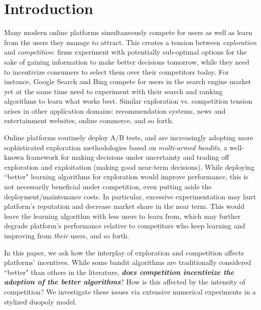 \documentclass[../competing_bandits_with_appendix.tex]{subfiles}
\begin{document}
\section{Introduction}\label{sec:intro}

Many modern online platforms simultaneously compete for users as well as learn from the users they manage to attract. This creates a tension between \textit{exploration} and \textit{competition}: firms experiment with potentially sub-optimal options for the sake of gaining information to make better decisions tomorrow, while they need to incentivize consumers to select them over their competitors today. For instance, Google Search and Bing compete for users in the search engine market yet at the same time need to experiment with their search and ranking algorithms to learn what works best. Similar exploration vs. competition tension arises in other application domains: recommendation systems, news and entertainment websites, online commerce, and so forth.


Online platforms routinely deploy A/B tests, and are increasingly adopting  more sophisticated exploration methodologies based on \emph{multi-armed bandits}, a well-known framework for making decisions under uncertainty and trading off exploration and exploitation (making good near-term decisions). While deploying ``better" learning algorithms for exploration would improve performance, this is not necessarily beneficial under competition, even putting aside the deployment/maintenance costs. In particular, excessive experimentation may hurt platform's reputation and decrease market share in the near term. This would leave the learning algorithm with less users to learn from, which may further degrade platform's performance relative to competitors who keep learning and improving from \emph{their} users, and so forth. 

In this paper, we ask how the interplay of exploration and competition affects platforms' incentives. While some bandit algorithms are traditionally considered ``better" than others in the literature, {\bf\em does competition incentivize the adoption of the better algorithms}? How is this affected by the intensity of competition? We investigate these issues via extensive numerical experiments in a stylized duopoly model.
\end{document}

